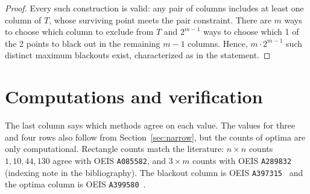 \documentclass[12pt]{article}
\theoremstyle{definition}\newtheorem{definition}{Definition}
\theoremstyle{remark}\newtheorem{remark}{Remark}
\begin{document}
\begin{proof}
Every such construction is valid: any pair of columns includes at least one column of
$T$, whose surviving point meets the pair constraint. There are $m$ ways to choose which
column to exclude from $T$ and $2^{m-1}$ ways to choose which 1 of the 2 points to
black out in the remaining $m-1$ columns. Hence, $m\cdot 2^{m-1}$ such distinct
maximum blackouts exist, characterized as in the statement.
\end{proof}



\section{Computations and verification}\label{sec:computations}
The last column says which methods agree on each value. The values for three and four
rows also follow from Section~\ref{sec:narrow}, but the counts of optima are only
computational.
Rectangle counts match the literature: $n\times n$ counts $1,10,44,130$ agree with
OEIS \texttt{A085582}, and $3\times m$ counts with OEIS \texttt{A289832} (indexing note in the bibliography).
The blackout column is OEIS \texttt{A397315}~\cite{oeisA397315} and the optima
column is OEIS \texttt{A399580}~\cite{oeisA399580}.
\end{document}
